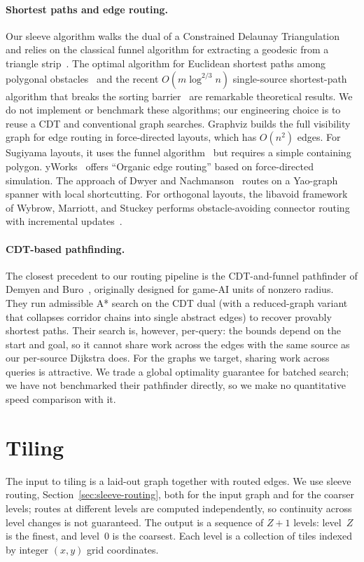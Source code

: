 \documentclass[review]{vgtc}          %
\begin{document}
\paragraph{Shortest paths and edge routing.}
Our sleeve algorithm walks the dual of a Constrained Delaunay
Triangulation~\cite{shewchuk2002delaunay} and relies on the classical
funnel algorithm for extracting a geodesic from a triangle
strip~\cite{lee1984euclidean,chazelle1982theorem,guibas1987linear,pathOpt}.
The optimal algorithm for Euclidean shortest paths among polygonal
obstacles~\cite{hershberger1999optimal} and the recent
$O(m\log^{2/3} n)$ single-source shortest-path algorithm that breaks
the sorting barrier~\cite{duan2025sorting} are remarkable theoretical
results. We do not implement or benchmark these algorithms; our
engineering choice is to reuse a CDT and conventional graph searches.
Graphviz builds the full visibility graph for edge routing in force-directed layouts, which has $O(n^2)$ edges. For Sugiyama layouts, it uses the funnel algorithm~\cite{dobkin1997implementing} but requires a simple containing polygon. yWorks~\cite{yworks} offers ``Organic edge routing'' based on force-directed simulation. The approach of Dwyer and Nachmanson~\cite{dwyer2010fast} routes on a Yao-graph spanner with local shortcutting. For orthogonal layouts, the libavoid framework of Wybrow, Marriott, and Stuckey performs obstacle-avoiding connector routing with incremental updates~\cite{wybrow2010orthogonal}.

\paragraph{CDT-based pathfinding.}
The closest precedent to our routing pipeline is the CDT-and-funnel
pathfinder of Demyen and Buro~\cite{demyen2006efficient}, originally
designed for game-AI units of nonzero radius. They run admissible A*
search on the CDT dual (with a reduced-graph variant that collapses
corridor chains into single abstract edges) to recover provably
shortest paths. Their search is, however, per-query: the bounds depend
on the start and goal, so it cannot share work across the edges with
the same source as our per-source Dijkstra does. For the graphs we
target, sharing work across queries is attractive. We trade a
global optimality guarantee for batched search; we have not
benchmarked their pathfinder directly, so we make no quantitative
speed comparison with it.


\section{Tiling}
\label{sec:tiling}
The input to tiling is a laid-out graph together with routed edges.
We use sleeve routing, Section~\ref{sec:sleeve-routing}, both for the
input graph and for the coarser levels; routes at different levels
are computed independently, so continuity across level changes is
not guaranteed. The output is a sequence of $Z{+}1$ levels: level~$Z$
is the finest, and level~$0$ is the coarsest. Each level is a
collection of tiles indexed by integer $(x,y)$ grid coordinates.
\end{document}

